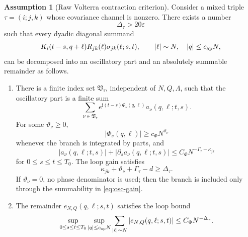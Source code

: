 \documentclass[11pt,reqno]{amsart}
\numberwithin{equation}{section}
\theoremstyle{plain}
\theoremstyle{definition}
\newtheorem{assumption}[theorem]{Assumption}
\newcommand{\eps}{\varepsilon}
\newcommand{\ii}{\mathrm i}
\begin{document}
\begin{assumption}[Raw Volterra contraction criterion]\label{ass:diag}
Consider a mixed triple \(\tau=(i;j,k)\) whose covariance channel is nonzero.  There exists a number
\begin{equation}\label{eq:diag-gain}
        \Delta_{\tau}>20\eps
\end{equation}
such that every dyadic diagonal summand
\begin{equation}\label{eq:diag-summand}
        K_i(t-s,q+\ell)R_{jk}(\ell)\sigma_{jk}(\ell;s,t),
        \qquad |\ell|\sim N,\quad |q|\le c_{\rm ap}N,
\end{equation}
can be decomposed into an oscillatory part and an absolutely summable remainder as follows.

\begin{enumerate}[label=(D\arabic*),leftmargin=2.2em]
\item There is a finite index set \(\mathfrak V_\tau\), independent of \(N,Q,\Lambda\), such that the oscillatory part is a finite sum
\begin{equation}\label{eq:osc-decomp}
        \sum_{\nu\in\mathfrak V_\tau}
        e^{\ii(t-s)\Phi_\nu(q,\ell)}a_\nu(q,\ell;t,s).
\end{equation}
For some \(\vartheta_\nu\ge0\),
\begin{equation}\label{eq:phase-lower}
        |\Phi_\nu(q,\ell)|\ge c_\Phi N^{\vartheta_\nu}
\end{equation}
whenever the branch is integrated by parts, and
\begin{equation}\label{eq:amp-bound}
        |a_\nu(q,\ell;t,s)|+|\partial_sa_\nu(q,\ell;t,s)|
        \le C_\Phi N^{-\Gamma_\tau-\kappa_{jk}}
\end{equation}
for \(0\le s\le t\le T_0\).  The loop gain satisfies
\begin{equation}\label{eq:osc-gain}
        \kappa_{jk}+\vartheta_\nu+\Gamma_\tau-d\ge \Delta_\tau .
\end{equation}
If \(\vartheta_\nu=0\), no phase denominator is used; then the branch is included only through the summability in \eqref{eq:osc-gain}.

\item The remainder \(e_{N,Q}(q,\ell;s,t)\) satisfies the loop bound
\begin{equation}\label{eq:remainder-loop}
        \sup_{0\le s\le t\le T_0}\sup_{|q|\le c_{\rm ap}N}
        \sum_{|\ell|\sim N}|e_{N,Q}(q,\ell;s,t)|
        \le C_\Phi N^{-\Delta_\tau}.
\end{equation}
\end{enumerate}

\end{assumption}
\end{document}
